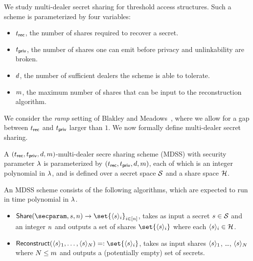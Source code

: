 We study multi-dealer secret sharing for threshold access structures. Such a scheme is parameterized by four variables:

\begin{itemize}
	\item $t_{\mathsf{rec}}$, the number of shares required to recover a secret.
	\item $t_{\mathsf{priv}}$, the number of shares one can emit before privacy and unlinkability are broken.
	\item $d$, the number of sufficient dealers the scheme is able to tolerate.
	\item  $m$, the maximum number of shares that can be input to the reconstruction algorithm.
\end{itemize}

We consider the \emph{ramp} setting of Blakley and Meadows~\cite{C:BlaMea84}, where we allow for a gap between $t_{\mathsf{rec}}$ and $t_{\mathsf{priv}}$ larger than $1$.
We now formally define multi-dealer secret sharing.

\begin{definition}
	A $(t_{\mathsf{rec}}, t_{\mathsf{priv}}, d, m)$-multi-dealer secre sharing scheme (MDSS) with security parameter $\lambda$ is parameterized by $(t_{\mathsf{rec}}, t_{\mathsf{priv}}, d, m)$, each of which is an integer polynomial in $\lambda$, and is defined over a secret space $\mathcal{S}$ and a share space $\mathcal{H}$.

	An MDSS scheme consists of the following algorithms, which are expected to run in time polynomial in $\lambda$.

	\begin{itemize}
		\item $\mdssShareAlg(\secparam, \mdssSecret, \mdssNumShares) \rightarrow \set{\mdssShare{\mdssSecret}_i}_{i \in [\mdssNumShares]}$, takes as input a secret $s \in \mathcal{S}$ and an integer $n$ and outputs a set of shares $\set{\mdssShare{\mdssSecret}_i}$ where each $\langle s \rangle_i \in \mathcal{H}$.
		\item $\mdssReconstructAlg(\mdssShare{\mdssSecret}_1, \dots, \mdssShare{\mdssSecret}_{\mdssWindowSize}) =: \set{\mdssShare{\mdssSecret}_i}$, takes as input shares $\langle s \rangle_1$, \dots, $\langle s \rangle_{N}$ where $N \leq m$ and outputs a (potentially empty) set of secrets.
	\end{itemize}
\end{definition}

